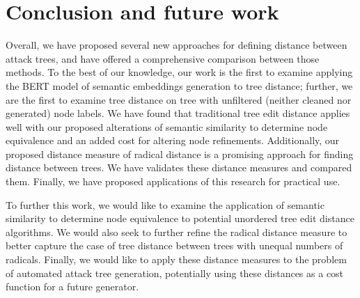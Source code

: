 \section{Conclusion and future work}
\label{sec:conclusion}

Overall, we have proposed several new approaches for defining distance between attack trees, and have offered a comprehensive comparison between those methods. To the best of our knowledge, our work is the first to examine applying the BERT model of semantic embeddings generation to tree distance; further, we are the first to examine tree distance on tree with unfiltered (neither cleaned nor generated) node labels. We have found that traditional tree edit distance applies well with our proposed alterations of semantic similarity to determine node equivalence and an added cost for altering node refinements. Additionally, our proposed distance measure of radical distance is a promising approach for finding distance between trees. We have validates these distance measures and compared them. Finally, we have proposed applications of this research for practical use.

To further this work, we would like to examine the application of semantic similarity to determine node equivalence to potential unordered tree edit distance algorithms. We would also seek to further refine the radical distance measure to better capture the case of tree distance between trees with unequal numbers of radicals. Finally, we would like to apply these distance measures to the problem of automated attack tree generation, potentially using these distances as a cost function for a future generator.